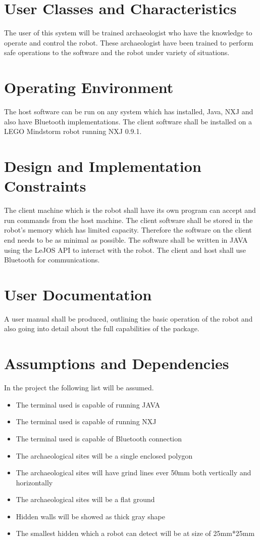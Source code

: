\documentclass[11pt, a4paper]{report}
\begin{document}
\section{User Classes and Characteristics}
The user of this system will be trained archaeologist who have the knowledge to operate and control the robot. These archaeologist have been trained to perform safe operations to the software and the robot under variety of situations.

\section{Operating Environment}
The host software can be run on any system which has installed, Java, NXJ and also have Bluetooth implementations.
The client software shall be installed on a LEGO\textregistered{} Mindstorm\textregistered{} robot running NXJ 0.9.1.

\section{Design and Implementation Constraints}
The client machine which is the robot shall have its own program can accept and run commands from the host machine. The client software shall be stored in the robot's memory which has limited capacity. Therefore the software on the client end needs to be as minimal as possible.
The software shall be written in JAVA using the LeJOS API to interact with the robot.
The client and host shall use Bluetooth\textregistered{}  for communications.

\section{User Documentation}
A user manual shall be produced, outlining the basic operation of the robot and also going into detail about the full capabilities of the package.


\section{Assumptions and Dependencies}
In the project the following list will be assumed.

\begin{itemize}
  \item{The terminal used is capable of running JAVA}
  \item{The terminal used is capable of running NXJ}
  \item{The terminal used is capable of Bluetooth connection}
  \item{The archaeological sites will be a single enclosed polygon}
  \item{The archaeological sites will have grind lines ever 50mm both vertically and horizontally}
  \item{The archaeological sites will be a flat ground}
  \item{Hidden walls will be showed as thick gray shape}
  \item{The smallest hidden which a robot can detect will be at size of 25mm*25mm}
\end{itemize}
\end{document}
